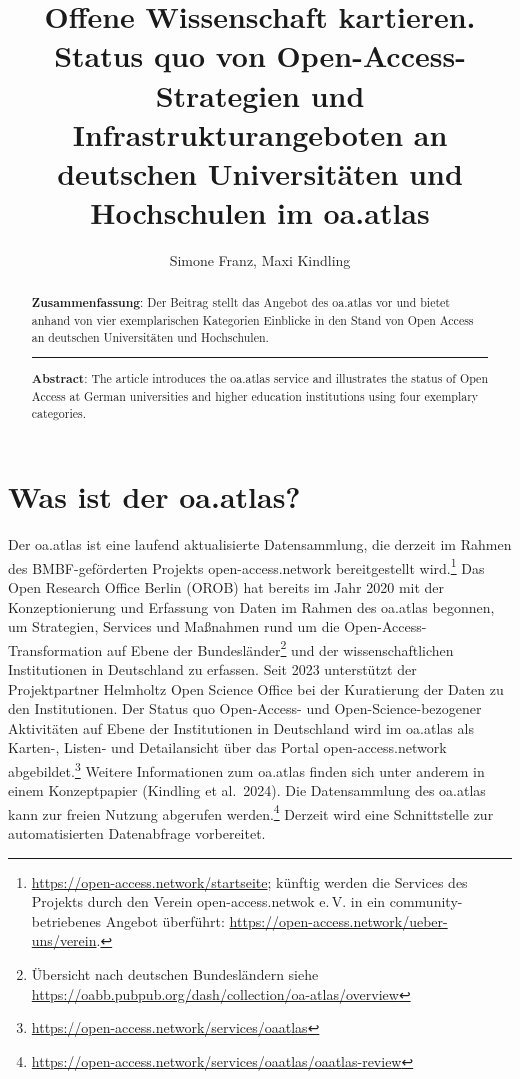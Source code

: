 \documentclass[a4paper,
fontsize=11pt,
oneside,
numbers=noperiodatend,
parskip=half-,
bibliography=totoc,
final
]{scrartcl}
\title{\LARGE{Offene Wissenschaft kartieren. Status quo von Open-Access-Strategien und Infrastrukturangeboten an deutschen Universitäten und Hochschulen im oa.atlas}}%
\author{Simone Franz, Maxi Kindling} %
\date{}
\begin{document}
\maketitle
\thispagestyle{fancyplain} 

\begin{abstract}
\noindent
\textbf{Zusammenfassung}: Der Beitrag stellt das Angebot des oa.atlas
vor und bietet anhand von vier exemplarischen Kategorien Einblicke in
den Stand von Open Access an deutschen Universitäten und Hochschulen.

\begin{center}\rule{0.5\linewidth}{0.5pt}\end{center}

\noindent
\textbf{Abstract}: The article introduces the oa.atlas service and
illustrates the status of Open Access at German universities and higher
education institutions using four exemplary categories.
\end{abstract}

\section{Was ist der oa.atlas?}\label{was-ist-der-oa.atlas}

Der oa.atlas ist eine laufend aktualisierte Datensammlung, die derzeit
im Rahmen des BMBF-geförderten Projekts open-access.network
bereitgestellt wird.\footnote{\url{https://open-access.network/startseite};
  künftig werden die Services des Projekts durch den Verein
  open-access.netwok e.\,V. in ein community-betriebenes Angebot
  überführt: \url{https://open-access.network/ueber-uns/verein}.} Das
Open Research Office Berlin (OROB) hat bereits im Jahr 2020 mit der
Konzeptionierung und Erfassung von Daten im Rahmen des oa.atlas
begonnen, um Strategien, Services und Maßnahmen rund um die
Open-Access-Transformation auf Ebene der Bundesländer\footnote{Übersicht
  nach deutschen Bundesländern siehe
  \url{https://oabb.pubpub.org/dash/collection/oa-atlas/overview}} und
der wissenschaftlichen Institutionen in Deutschland zu erfassen. Seit
2023 unterstützt der Projektpartner Helmholtz Open Science Office bei
der Kuratierung der Daten zu den Institutionen. Der Status quo
Open-Access- und Open-Science-bezogener Aktivitäten auf Ebene der
Institutionen in Deutschland wird im oa.atlas als Karten-, Listen- und
Detailansicht über das Portal open-access.network abgebildet.\footnote{\url{https://open-access.network/services/oaatlas}}
Weitere Informationen zum oa.atlas finden sich unter anderem in einem
Konzeptpapier (Kindling et al.~2024). Die Datensammlung des oa.atlas
kann zur freien Nutzung abgerufen werden.\footnote{\url{https://open-access.network/services/oaatlas/oaatlas-review}}
Derzeit wird eine Schnittstelle zur automatisierten Datenabfrage
vorbereitet.
\end{document}
